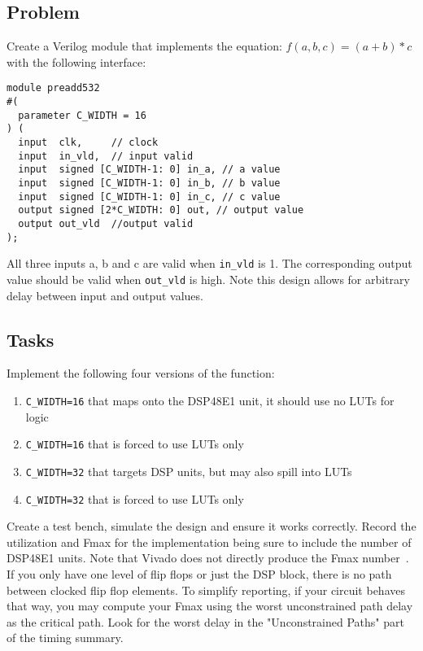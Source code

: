 \documentclass{article}
\begin{document}
\subsection{Problem}

Create a Verilog module that implements the equation: $f(a,b,c) = (a+b)*c$ with the following interface:
\begin{verbatim}
module preadd532
#(
  parameter C_WIDTH = 16
) (
  input  clk,     // clock
  input  in_vld,  // input valid
  input  signed [C_WIDTH-1: 0] in_a, // a value
  input  signed [C_WIDTH-1: 0] in_b, // b value
  input  signed [C_WIDTH-1: 0] in_c, // c value
  output signed [2*C_WIDTH: 0] out, // output value
  output out_vld  //output valid
);
\end{verbatim}
All three inputs a, b and c are valid when \verb|in_vld| is 1.
The corresponding output value should be valid when \verb|out_vld| is high.
Note this design allows for arbitrary delay between input and output values.

\subsection{Tasks}
Implement the following four versions of the function:
\begin{enumerate}
\item \verb|C_WIDTH=16| that maps onto the DSP48E1 unit, it should use no LUTs for logic
\item \verb|C_WIDTH=16| that is forced to use LUTs only
\item \verb|C_WIDTH=32| that targets DSP units, but may also spill into LUTs
\item \verb|C_WIDTH=32| that is forced to use LUTs only
\end{enumerate}

Create a test bench, simulate the design and ensure it works correctly.
Record the utilization and Fmax for the implementation being sure to include the number of DSP48E1 units.
Note that Vivado does not directly produce the Fmax number~\cite{vivadofmax}.
If you only have one level of flip flops or just the DSP block, there is no path between clocked flip flop elements. To simplify reporting, if your circuit behaves that way, you may compute your Fmax using the worst unconstrained path delay as the critical path.
Look for the worst delay in the "Unconstrained Paths" part of the timing summary.
\end{document}
